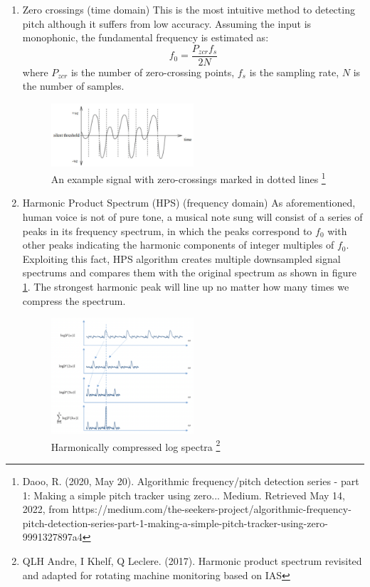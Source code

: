 \begin{enumerate}[label=\textbf{\arabic*})]
    \item Zero crossings (time domain)
    This is the most intuitive method to detecting pitch although it suffers from low accuracy.
    Assuming the input is monophonic, the fundamental frequency is estimated as:
    \[f_0 = \frac{P_{zcr}f_s}{2N}\]
    where $P_{zcr}$ is the number of zero-crossing points, $f_s$ is the sampling rate,
    $N$ is the number of samples.
    \begin{figure}[h]
        \centering
        \includegraphics[width=0.5\textwidth]{Figures/zcr.png}
        \caption{An example signal with zero-crossings marked in dotted lines \protect\footnote{Daoo, R. (2020, May 20). Algorithmic frequency/pitch detection series - part 1: Making a simple pitch tracker using zero... Medium. Retrieved May 14, 2022, from https://medium.com/the-seekers-project/algorithmic-frequency-pitch-detection-series-part-1-making-a-simple-pitch-tracker-using-zero-9991327897a4}}
    \end{figure}

    \item Harmonic Product Spectrum (HPS) (frequency domain)
    As aforementioned, human voice is not of pure tone, a musical note sung will consist of a series of peaks in its frequency spectrum,
    in which the peaks correspond to $f_0$ with other peaks indicating the harmonic components of integer multiples of $f_0$. 
    Exploiting this fact, HPS algorithm creates multiple downsampled signal spectrums and compares them with the original spectrum as shown in figure 
    \cref{HPS}. The strongest harmonic peak will line up no matter how many times we compress the spectrum.
    
    \begin{figure}[h]
        \centering
        \includegraphics[width=0.5\textwidth]{Figures/HPS.png}
        \caption{Harmonically compressed log spectra \protect\footnote{QLH Andre, I Khelf, Q Leclere. (2017). Harmonic product spectrum revisited and adapted for rotating machine monitoring based on IAS}}
        \label{HPS}
    \end{figure}
    

\end{enumerate}
